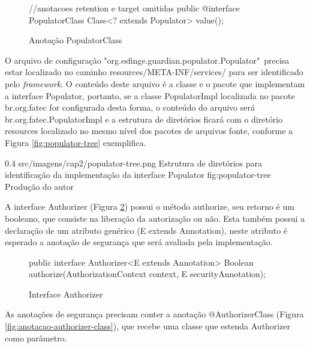 \begin{figure}[H]
    \centering
    \caption{Anotação PopulatorClass}
    \begin{java}
//anotacoes retention e target omitidas
public @interface PopulatorClass {
	Class<? extends Populator> value();
}
    \end{java}
    \label{fig:populator-class}
\end{figure}

\par O arquivo de configuração "org.esfinge.guardian.populator.Populator"\ precisa estar localizado no caminho resources/META-INF/services/ para ser identificado pelo \textit{framework}. O conteúdo deste arquivo é a classe e o pacote que implementam a interface Populator, portanto, se a classe PopulatorImpl localizada no pacote br.org.fatec for configurada desta forma, o conteúdo do arquivo será br.org.fatec.PopulatorImpl e a estrutura de diretórios ficará com o diretório resources localizado no mesmo nível dos pacotes de arquivos fonte, conforme a Figura \ref{fig:populator-tree} exemplifica.

\begin{image}
{0.4} %
{src/imagens/cap2/populator-tree.png} %
{Estrutura de diretórios para identificação da implementação da interface Populator} %
{fig:populator-tree} %
{Produção do autor} %
\end{image}

\par A interface Authorizer (Figura \ref{fig:interface-authorizer}) possui o método authorize, seu retorno é um booleano, que consiste na liberação da autorização ou não. Esta também possui a declaração de um atributo genérico (E extends Annotation), neste atributo é esperado a anotação de segurança que será avaliada pela implementação. 

\begin{figure}[H]
    \centering
    \caption{Interface Authorizer}
    \begin{java}
public interface Authorizer<E extends Annotation> {
	Boolean authorize(AuthorizationContext context, E securityAnnotation);
}
    \end{java}
    \label{fig:interface-authorizer}
\end{figure}

\par As anotações de segurança precisam conter a anotação @AuthorizerClass (Figura \ref{fig:anotacao-authorizer-class}), que recebe uma classe que estenda Authorizer como parâmetro.

